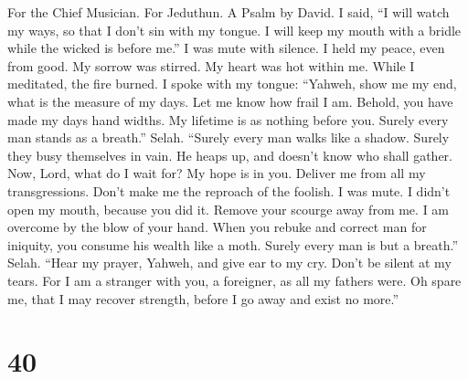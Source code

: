 For the Chief Musician. For Jeduthun. A Psalm by David.  I
said, ``I will watch my ways, so that I don't sin with my tongue. I will
keep my mouth with a bridle while the wicked is before me.''
 I was mute with silence. I held my peace, even from good.
My sorrow was stirred.  My heart was hot within me. While
I meditated, the fire burned. I spoke with my tongue: 
``Yahweh, show me my end, what is the measure of my days. Let me know
how frail I am.  Behold, you have made my days hand
widths. My lifetime is as nothing before you. Surely every man stands as
a breath.'' Selah.  ``Surely every man walks like a
shadow. Surely they busy themselves in vain. He heaps up, and doesn't
know who shall gather.  Now, Lord, what do I wait for? My
hope is in you.  Deliver me from all my transgressions.
Don't make me the reproach of the foolish.  I was mute. I
didn't open my mouth, because you did it.  Remove your
scourge away from me. I am overcome by the blow of your hand.
 When you rebuke and correct man for iniquity, you
consume his wealth like a moth. Surely every man is but a breath.''
Selah.  ``Hear my prayer, Yahweh, and give ear to my cry.
Don't be silent at my tears. For I am a stranger with you, a foreigner,
as all my fathers were.  Oh spare me, that I may recover
strength, before I go away and exist no more.''

\hypertarget{section-39}{%
\section{40}\label{section-39}}

